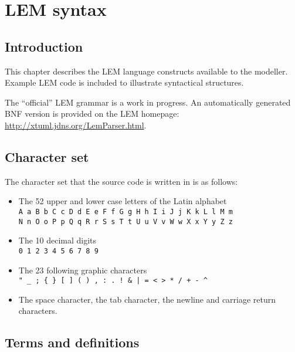 \chapter{LEM syntax}

\section{Introduction}

This chapter describes the LEM language constructs available to the modeller.
Example LEM code is included to illustrate syntactical structures.

The ``official'' LEM grammar is a work in progress. An automatically generated
BNF version is provided on the LEM homepage:
\href{http://xtuml.jdns.org/LemParser.html}{http://xtuml.jdns.org/LemParser.html}.

\section{Character set}

The character set that the source code is written in is as follows:

\begin{itemize}
        \item The 52 upper and lower case letters of the Latin alphabet\\
\verb|A a B b C c D d E e F f G g H h I i J j K k L l M m|\\
\verb|N n O o P p Q q R r S s T t U u V v W w X x Y y Z z|

        \item The 10 decimal digits\\
\verb|0 1 2 3 4 5 6 7 8 9|

        \item The 23 following graphic characters\\
\verb$" _ ; { } [ ] ( ) , : . ! & | = < > * / + - ^$

        \item The space character, the tab character, 
        the newline and carriage return characters.

\end{itemize}

\section{Terms and definitions}

